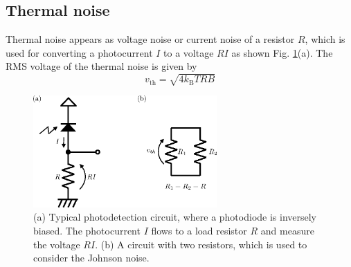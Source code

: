 \documentclass{book}
\begin{document}
\subsection{Thermal noise}
Thermal noise appears as voltage noise or current noise of a resistor $R$, which is used for converting a photocurrent $I$ to a voltage $RI$ as shown Fig. \ref{fig:photodetector}(a). The RMS voltage of the thermal noise is given by
\begin{equation}
	v_\mathrm{th} = \sqrt{4k_\mathrm{B}TRB}
	\label{eq:Johnson_noise}
\end{equation}
\begin{figure}
  \centering
  \includegraphics[width=7cm]{fig/1-2_PD_circuit.eps} 
  \caption{(a) Typical photodetection circuit, where a photodiode is inversely biased. The photocurrent $I$ flows to a load resistor $R$ and measure the voltage $RI$. (b) A circuit with two resistors, which is used to consider the Johnson noise.}
  \label{fig:photodetector}
\end{figure}

\end{document}
